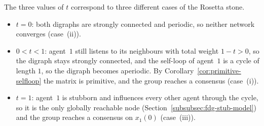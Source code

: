 The three values of $t$ correspond to three different cases of the Rosetta stone.
\begin{itemize}
  \item $t = 0$: both digraphs are strongly connected and periodic, so neither
        network converges (case~(ii)).
  \item $0 < t < 1$: agent~$1$ still listens to its neighbours with total weight
        $1-t > 0$, so the digraph stays strongly connected, and the self-loop of
        agent~$1$ is a cycle of length $1$, so the digraph becomes aperiodic. By
        Corollary~\ref{cor:primitive-selfloop} the matrix is primitive, and the group reaches a
        consensus (case~(i)).
  \item $t = 1$: agent~$1$ is stubborn and influences every other agent through the
        cycle, so it is the only globally reachable node
        (Section~\ref{subsubsec:fdg-stub-model}) and the group reaches a consensus on
        $x_1(0)$ (case~(iii)).
\end{itemize}

